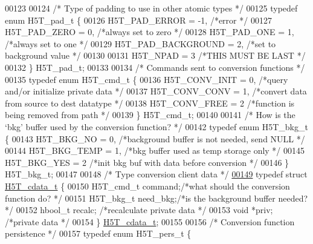 \begin{DoxyCode}
00123 
00124 \textcolor{comment}{/* Type of padding to use in other atomic types */}
00125 \textcolor{keyword}{typedef} \textcolor{keyword}{enum} H5T\_pad\_t \{
00126     H5T\_PAD\_ERROR        = -1,  \textcolor{comment}{/*error                                      */}
00127     H5T\_PAD\_ZERO         = 0,   \textcolor{comment}{/*always set to zero                         */}
00128     H5T\_PAD\_ONE          = 1,   \textcolor{comment}{/*always set to one                          */}
00129     H5T\_PAD\_BACKGROUND   = 2,   \textcolor{comment}{/*set to background value                    */}
00130 
00131     H5T\_NPAD             = 3    \textcolor{comment}{/*THIS MUST BE LAST                          */}
00132 \} H5T\_pad\_t;
00133 
00134 \textcolor{comment}{/* Commands sent to conversion functions */}
00135 \textcolor{keyword}{typedef} \textcolor{keyword}{enum} H5T\_cmd\_t \{
00136     H5T\_CONV\_INIT   = 0,    \textcolor{comment}{/*query and/or initialize private data       */}
00137     H5T\_CONV\_CONV   = 1,    \textcolor{comment}{/*convert data from source to dest datatype */}
00138     H5T\_CONV\_FREE   = 2 \textcolor{comment}{/*function is being removed from path        */}
00139 \} H5T\_cmd\_t;
00140 
00141 \textcolor{comment}{/* How is the `bkg' buffer used by the conversion function? */}
00142 \textcolor{keyword}{typedef} \textcolor{keyword}{enum} H5T\_bkg\_t \{
00143     H5T\_BKG\_NO      = 0,    \textcolor{comment}{/*background buffer is not needed, send NULL */}
00144     H5T\_BKG\_TEMP    = 1,    \textcolor{comment}{/*bkg buffer used as temp storage only       */}
00145     H5T\_BKG\_YES     = 2 \textcolor{comment}{/*init bkg buf with data before conversion   */}
00146 \} H5T\_bkg\_t;
00147 
00148 \textcolor{comment}{/* Type conversion client data */}
\hyperlink{struct_h5_t__cdata__t}{00149} \textcolor{keyword}{typedef} \textcolor{keyword}{struct }\hyperlink{struct_h5_t__cdata__t}{H5T\_cdata\_t} \{
00150     H5T\_cmd\_t       command;\textcolor{comment}{/*what should the conversion function do?    */}
00151     H5T\_bkg\_t       need\_bkg;\textcolor{comment}{/*is the background buffer needed?      */}
00152     hbool\_t     recalc; \textcolor{comment}{/*recalculate private data           */}
00153     \textcolor{keywordtype}{void}        *priv;  \textcolor{comment}{/*private data                   */}
00154 \} \hyperlink{struct_h5_t__cdata__t}{H5T\_cdata\_t};
00155 
00156 \textcolor{comment}{/* Conversion function persistence */}
00157 \textcolor{keyword}{typedef} \textcolor{keyword}{enum} H5T\_pers\_t \{

\end{DoxyCode}
